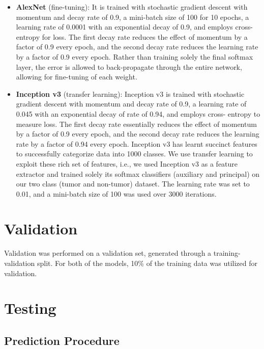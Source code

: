 \begin{itemize}
    \item \textbf{AlexNet} (fine-tuning): 
        It is trained with stochastic gradient descent with momentum and decay rate of 0.9, a mini-batch size of 100 for 10 epochs, a learning rate of 0.0001 with an exponential decay of 0.9, and employs cross-entropy for loss. The first decay rate reduces the effect of momentum by a factor of 0.9 every epoch, and the second decay rate reduces the learning rate by a factor of 0.9 every epoch. Rather than training solely the final softmax layer, the error is allowed to back-propagate through the entire network, allowing for fine-tuning of each weight.
    \item \textbf{Inception v3} (transfer learning):
        Inception v3 is trained with stochastic gradient descent with momentum and decay rate of 0.9, a learning rate of 0.045 with an exponential decay of rate of 0.94, and employs cross- entropy to measure loss. The first decay rate essentially reduces the effect of momentum by a factor of 0.9 every epoch, and the second decay rate reduces the learning rate by a factor of 0.94 every epoch. Inception v3 has learnt succinct features to successfully categorize data into 1000 classes. We use transfer learning to exploit these rich set of features, i.e., we used Inception v3 as a feature extractor and trained solely its softmax classifiers (auxiliary and principal) on our two class (tumor and non-tumor) dataset. The learning rate was set to 0.01, and a mini-batch size of 100 was used over 3000 iterations. 
\end{itemize}

\section{Validation}

\par
Validation was performed on a validation set, generated through a training-validation split.
For both of the models, 10\% of the training data was utilized for validation. 

\section{Testing}

\subsection{Prediction Procedure}
\label{subsec:prediction_procedure}

